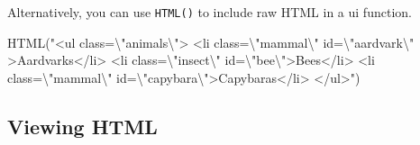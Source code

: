 \documentclass[
  oneside]{book}
\newenvironment{Shaded}{\begin{snugshade}}{\end{snugshade}}
\newcommand{\AttributeTok}[1]{\textcolor[rgb]{0.77,0.63,0.00}{#1}}
\newcommand{\FunctionTok}[1]{\textcolor[rgb]{0.00,0.00,0.00}{#1}}
\newcommand{\NormalTok}[1]{#1}
\newcommand{\SpecialCharTok}[1]{\textcolor[rgb]{0.00,0.00,0.00}{#1}}
\newcommand{\StringTok}[1]{\textcolor[rgb]{0.31,0.60,0.02}{#1}}
\begin{document}
\begin{Shaded}
\end{Shaded}

Alternatively, you can use \texttt{HTML}\texttt{()} to include raw HTML in a ui function.

\begin{Shaded}
\begin{Highlighting}[]
\FunctionTok{HTML}\NormalTok{(}\StringTok{"\textless{}ul class=}\SpecialCharTok{\textbackslash{}"}\StringTok{animals}\SpecialCharTok{\textbackslash{}"}\StringTok{\textgreater{}}
\StringTok{    \textless{}li class=}\SpecialCharTok{\textbackslash{}"}\StringTok{mammal}\SpecialCharTok{\textbackslash{}"}\StringTok{ id=}\SpecialCharTok{\textbackslash{}"}\StringTok{aardvark}\SpecialCharTok{\textbackslash{}"}\StringTok{ \textgreater{}Aardvarks\textless{}/li\textgreater{}}
\StringTok{    \textless{}li class=}\SpecialCharTok{\textbackslash{}"}\StringTok{insect}\SpecialCharTok{\textbackslash{}"}\StringTok{ id=}\SpecialCharTok{\textbackslash{}"}\StringTok{bee}\SpecialCharTok{\textbackslash{}"}\StringTok{\textgreater{}Bees\textless{}/li\textgreater{}}
\StringTok{    \textless{}li class=}\SpecialCharTok{\textbackslash{}"}\StringTok{mammal}\SpecialCharTok{\textbackslash{}"}\StringTok{ id=}\SpecialCharTok{\textbackslash{}"}\StringTok{capybara}\SpecialCharTok{\textbackslash{}"}\StringTok{\textgreater{}Capybaras\textless{}/li\textgreater{}}
\StringTok{\textless{}/ul\textgreater{}"}\NormalTok{)}
\end{Highlighting}
\end{Shaded}

\hypertarget{viewing-html}{%
\subsection{Viewing HTML}\label{viewing-html}}
\end{document}
